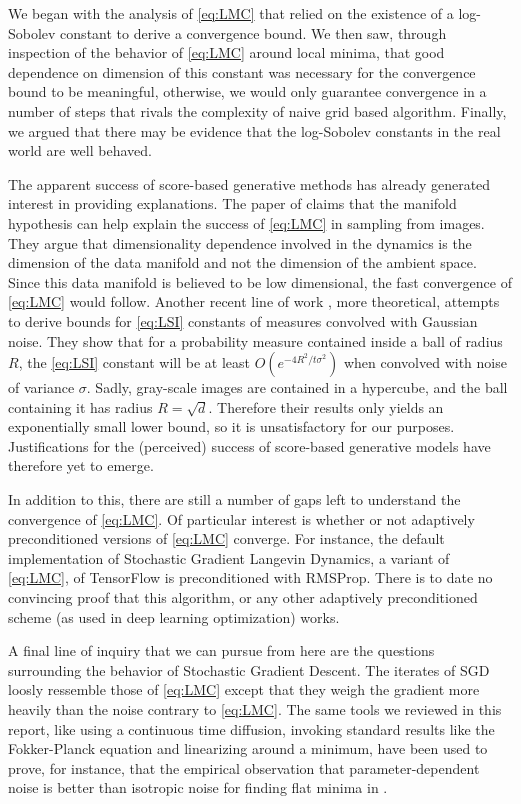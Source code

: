 \documentclass[11pt,twoside]{article}
\theoremstyle{definition}
\begin{document}
We began with the analysis of \eqref{eq:LMC} that relied on the existence of a log-Sobolev constant to derive a convergence bound. We then saw, through inspection of the behavior of \eqref{eq:LMC} around local minima, that good dependence on dimension of this constant was necessary for the convergence bound to be meaningful, otherwise, we would only guarantee convergence in a number of steps that rivals the complexity of naive grid based algorithm.  Finally, we argued that there may be evidence that the log-Sobolev constants in the real world are well behaved.

The apparent success of score-based generative methods has already generated interest in providing explanations. The paper of \cite{block_fast_2020} claims that the manifold hypothesis can help explain the success of \eqref{eq:LMC} in sampling from images. They argue that dimensionality dependence involved in the dynamics is the dimension of the data manifold and not the dimension of the ambient space. Since this data manifold is believed to be low dimensional, the fast convergence of \eqref{eq:LMC} would follow. Another recent line of work \cite{chen_dimension-free_2021}, more theoretical, attempts to derive bounds for \eqref{eq:LSI} constants of measures convolved with Gaussian noise. They show that for a probability measure contained inside a ball of radius $R$, the \eqref{eq:LSI} constant will be at least $O(e^{-4R^2/t\sigma^2})$ when convolved with noise of variance $\sigma$. Sadly, gray-scale images are contained in a hypercube, and the ball containing it has radius $R = \sqrt{d}$. Therefore their results only yields an exponentially small lower bound, so it is unsatisfactory for our purposes. Justifications for the (perceived) success of score-based generative models have therefore yet to emerge.

In addition to this, there are still a number of gaps left to understand the convergence of \eqref{eq:LMC}. Of particular interest is whether or not adaptively preconditioned versions of \eqref{eq:LMC} converge. For instance, the default implementation of Stochastic Gradient Langevin Dynamics, a variant of \eqref{eq:LMC}, of TensorFlow is preconditioned with RMSProp. There is to date no convincing proof that this algorithm, or any other adaptively preconditioned scheme (as used in deep learning optimization) works.  

A final line of inquiry that we can pursue from here are the questions surrounding the behavior of Stochastic Gradient Descent. The iterates of SGD loosly ressemble those of \eqref{eq:LMC} except that they weigh the gradient more heavily than the noise contrary to \eqref{eq:LMC}. The same tools we reviewed in this report, like using a continuous time diffusion, invoking standard results like the Fokker-Planck equation and linearizing around a minimum, have been used to prove, for instance, that the empirical observation that parameter-dependent noise is better than isotropic noise for finding flat minima in \cite{xie_diffusion_2020}. 
\end{document}

